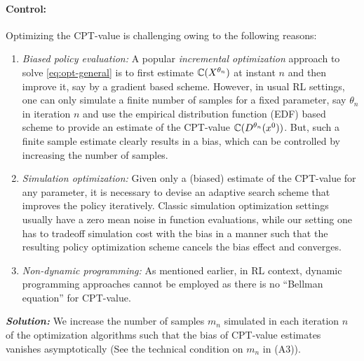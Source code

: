 \documentclass[11pt,letterpaper,english]{article}
\begin{document}
\paragraph{Control:} Optimizing the CPT-value is challenging owing to the following reasons:
\begin{enumerate}[\bfseries (i)]
\item \textit{Biased policy evaluation:} A popular \textit{incremental optimization} approach to solve \eqref{eq:opt-general} is to first estimate $\mathbb{C}(X^{\theta_n})$ at instant $n$ and then improve it, say by a gradient based scheme. However, in usual RL settings, one can only simulate a finite number of samples for a fixed parameter, say $\theta_n$ in iteration $n$ and use the empirical distribution function (EDF) based scheme to provide an estimate of the CPT-value $\mathbb{C}(D^{\theta_n}(x^0))$. But, such a finite sample estimate clearly results in a bias, which can be controlled by increasing the number of samples.
\item \textit{Simulation optimization:} Given only a (biased) estimate of the CPT-value for any parameter, it is necessary to devise an adaptive search scheme that improves the policy iteratively. Classic simulation optimization settings usually have a zero mean noise in function evaluations, while our setting one has to tradeoff simulation cost with the bias in a manner such that the resulting policy optimization scheme cancels the bias effect and converges. 
\item \textit{Non-dynamic programming:} As mentioned earlier, in RL context, dynamic programming approaches cannot be employed as there is no ``Bellman equation'' for CPT-value.  
\end{enumerate}
\textit{\textbf{Solution:}} 
We increase the number of samples $m_n$ simulated in each iteration $n$ of the optimization algorithms such that the bias of CPT-value estimates vanishes asymptotically (See the technical condition on $m_n$ in (A3)).
\end{document}

